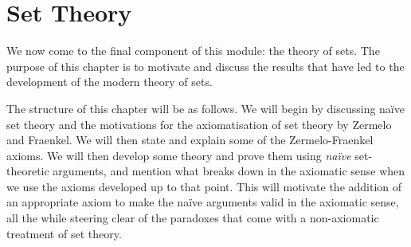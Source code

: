 \chapter{Set Theory}
\thispagestyle{empty}

We now come to the final component of this module: the theory of sets. The purpose of this chapter is to motivate and discuss the results that have led to the development of the modern theory of sets.

The structure of this chapter will be as follows. We will begin by discussing naïve set theory and the motivations for the axiomatisation of set theory by Zermelo and Fraenkel. We will then state and explain some of the Zermelo-Fraenkel axioms. We will then develop some theory and prove them using \textit{naïve} set-theoretic arguments, and mention what breaks down in the axiomatic sense when we use the axioms developed up to that point. This will motivate the addition of an appropriate axiom to make the naïve arguments valid in the axiomatic sense, all the while steering clear of the paradoxes that come with a non-axiomatic treatment of set theory.



